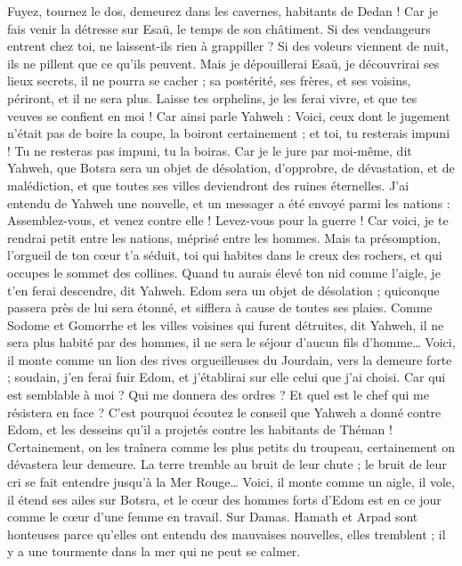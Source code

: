 \begin{multicols}{2}
Fuyez, tournez le dos, demeurez dans les cavernes, habitants de Dedan ! Car je fais venir la détresse sur Esaü, le temps de son châtiment.
Si des vendangeurs entrent chez toi, ne laissent-ils rien à grappiller ? Si des voleurs viennent de nuit, ils ne pillent que ce qu'ils peuvent.
Mais je dépouillerai Esaü, je découvrirai ses lieux secrets, il ne pourra se cacher ; sa postérité, ses frères, et ses voisins, périront, et il ne sera plus.
Laisse tes orphelins, je les ferai vivre, et que tes veuves se confient en moi !
Car ainsi parle Yahweh : Voici, ceux dont le jugement n'était pas de boire la coupe, la boiront certainement ; et toi, tu resterais impuni ! Tu ne resteras pas impuni, tu la boiras.
Car je le jure par moi-même, dit Yahweh, que Botsra sera un objet de désolation, d'opprobre, de dévastation, et de malédiction, et que toutes ses villes deviendront des ruines éternelles.
J'ai entendu de Yahweh une nouvelle, et un messager a été envoyé parmi les nations : Assemblez-vous, et venez contre elle ! Levez-vous pour la guerre !
Car voici, je te rendrai petit entre les nations, méprisé entre les hommes.
Mais ta présomption, l'orgueil de ton cœur t'a séduit, toi qui habites dans le creux des rochers, et qui occupes le sommet des collines. Quand tu aurais élevé ton nid comme l'aigle, je t'en ferai descendre, dit Yahweh.
Edom sera un objet de désolation ; quiconque passera près de lui sera étonné, et sifflera à cause de toutes ses plaies.
Comme Sodome et Gomorrhe et les villes voisines qui furent détruites, dit Yahweh, il ne sera plus habité par des hommes, il ne sera le séjour d'aucun fils d'homme…
Voici, il monte comme un lion des rives orgueilleuses du Jourdain, vers la demeure forte ; soudain, j'en ferai fuir Edom, et j'établirai sur elle celui que j'ai choisi. Car qui est semblable à moi ? Qui me donnera des ordres ? Et quel est le chef qui me résistera en face ?
C'est pourquoi écoutez le conseil que Yahweh a donné contre Edom, et les desseins qu'il a projetés contre les habitants de Théman ! Certainement, on les traînera comme les plus petits du troupeau, certainement on dévastera leur demeure.
La terre tremble au bruit de leur chute ; le bruit de leur cri se fait entendre jusqu'à la Mer Rouge…
Voici, il monte comme un aigle, il vole, il étend ses ailes sur Botsra, et le cœur des hommes forts d'Edom est en ce jour comme le cœur d'une femme en travail.
Sur Damas. Hamath et Arpad sont honteuses parce qu'elles ont entendu des mauvaises nouvelles, elles tremblent ; il y a une tourmente dans la mer qui ne peut se calmer.

\end{multicols}
